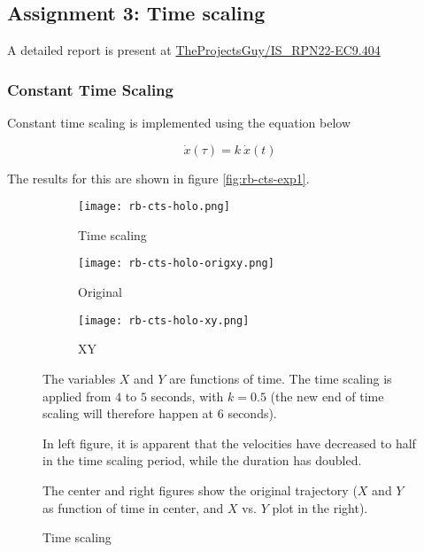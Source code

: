 \subsection{Assignment 3: Time scaling}

A detailed report is present at \href{https://github.com/TheProjectsGuy/IS_RPN22-EC9.404/tree/main/assignment-2b-over-9000}{TheProjectsGuy/IS\_RPN22-EC9.404}

\subsubsection{Constant Time Scaling}

Constant time scaling is implemented using the equation below

\begin{equation}
    \dot{x} (\tau) = k \: \dot{x}(t)
\end{equation}

The results for this are shown in figure \ref{fig:rb-cts-exp1}.

\begin{figure}[ht]
    \centering
    \begin{subfigure}[b]{0.4\textwidth}
        \texttt{[image: rb-cts-holo.png]}
        \caption{Time scaling}
    \end{subfigure}
    \begin{subfigure}[b]{0.3\textwidth}
        \texttt{[image: rb-cts-holo-origxy.png]}
        \caption{Original}
    \end{subfigure}
    \begin{subfigure}[b]{0.25\textwidth}
        \texttt{[image: rb-cts-holo-xy.png]}
        \caption{XY}
    \end{subfigure}
    \caption{Time scaling}
    \label{fig:cts-rb-holo}
    \small
        The variables $X$ and $Y$ are functions of time. The time scaling is applied from $4$ to $5$ seconds, with $k=0.5$ (the new end of time scaling will therefore happen at $6$ seconds).

        In left figure, it is apparent that the velocities have decreased to half in the time scaling period, while the duration has doubled.

        The center and right figures show the original trajectory ($X$ and $Y$ as function of time in center, and $X$ vs. $Y$ plot in the right).
\end{figure}

